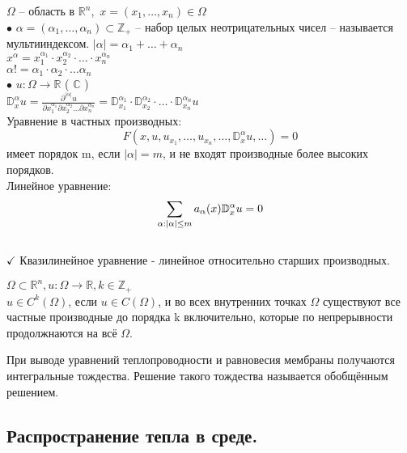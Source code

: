 \documentclass{article}
\begin{document}
$\Omega$ -- область в $\mathbb{R}^{n}$,\, $x = (x_1, \dots, x_n) \in \Omega$ \\
\vspace{14}
$\bullet$ $\alpha = (\alpha_1, \dots, \alpha_n) \subset \mathbb{Z}_+$ -- набор целых неотрицательных чисел -- называется мультииндексом. $|\alpha| = \alpha_1 + \dots + \alpha_n$ \\
$x^{\alpha} = x_1^{\alpha_1} \cdot x_2^{\alpha_2} \cdot \ldots \cdot x_n^{\alpha_n}$ \\
$\alpha!=\alpha_1 \cdot \alpha_2 \cdot \dots \alpha_n$ \\
\vspace{14}
$\bullet$ $u: \Omega \to \mathbb{R}$ ( $\mathbb{C}$ ) \\
$\mathbb{D}_{x}^{\alpha} u = \frac{\partial^{|\alpha|} u}{\partial x_1^{\alpha_1} \partial x_2^{\alpha_2} \dots \partial x_n^{\alpha_n}} = \mathbb{D}_{x_1}^{\alpha_1} \cdot \mathbb{D}_{x_2}^{\alpha_2} \cdot \dots \cdot \mathbb{D}_{x_n}^{\alpha_n} u$ \\
Уравнение в частных производных:
$$
F(x,u, u_{x_1}, \dots, u_{x_n}, \dots, \mathbb{D}_{x}^{\alpha} u, \dots) = 0
$$ 
имеет порядок m, если $|\alpha| =m$, и не входят производные более высоких порядков. \\
Линейное уравнение:
$$
\sum_{\alpha:|\alpha| \le m} a_{\alpha}(x)\mathbb{D}_{x}^{\alpha} u = 0 \\
$$ \\
$\checkmark$ Квазилинейное уравнение - линейное относительно старших производных.
\vspace{14}
\begin{definition}
$\Omega \subset \mathbb{R}^n , u : \Omega \to \mathbb{R}, k \in \mathbb{Z}_{+}$ \\
$u \in C^{k}(\Omega)$, если $ u \in C(\Omega)$, и во всех внутренних точках $\Omega$ существуют все частные производные до порядка k включительно, которые по непрерывности продолжнаются на всё $\Omega.$ \\
\end{definition}

При выводе уравнений теплопроводности и равновесия мембраны получаются интегральные тождества. Решение такого тождества называется обобщённым решением. \\

\subsection{Распространение тепла в среде.} 
\end{document}
